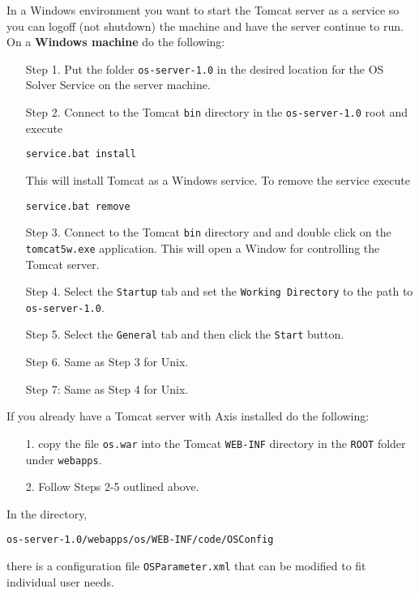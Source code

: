 \documentclass[11pt]{article}
\renewcommand{\_}{{\char"5F}}
\renewcommand{\{}{{\char"7B}}
\renewcommand{\}}{{\char"7D}}
\renewcommand{\^}{{\char"0D}}
\renewcommand{\'}{{\char"0D}}
\begin{document}
In a Windows environment you want to start the Tomcat server as a service so you can logoff (not shutdown) the machine and have the server continue to run.   On a {\bf Windows machine} do the following:

\begin{itemize}

\item[Step 1.]  Put the folder  {\tt os-server-1.0}   in the desired location for the OS Solver Service on the server machine. 

\item[Step 2.]  Connect to the Tomcat {\tt bin} directory in the {\tt os-server-1.0} root and execute 
\begin{verbatim}
service.bat install
\end{verbatim}
This will install Tomcat as a Windows service.  To remove the service execute
\begin{verbatim}
service.bat remove
\end{verbatim}

\item[Step 3.]  Connect to the Tomcat {\tt bin} directory and and double click on the {\tt tomcat5w.exe} application.  This will open a Window for controlling the Tomcat server. 

\item[Step 4.]  Select the {\tt Startup} tab and set the {\tt Working Directory} to the path to {\tt os-server-1.0}.

\item[Step 5.]  Select the {\tt General} tab and then click the {\tt Start} button.

\item[Step 6.] Same as Step 3 for Unix.

\item[Step 7:] Same as Step 4 for Unix.

\end{itemize}


If you already have a Tomcat server with Axis installed do the following:
\begin{itemize}
\item[1.] copy the file {\tt os.war} into the Tomcat {\tt WEB-INF} directory in the {\tt ROOT} folder under {\tt webapps}.

\item[2.]  Follow Steps 2-5 outlined above.
\end{itemize} 

In the directory,
\begin{verbatim}
os-server-1.0/webapps/os/WEB-INF/code/OSConfig
\end{verbatim}
there is a configuration file {\tt OSParameter.xml} that can be modified to fit individual user needs. 
\end{document}
